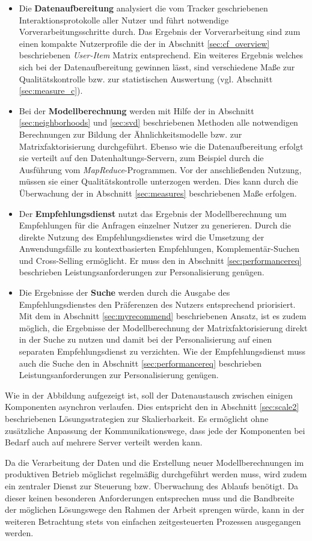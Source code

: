 \begin{itemize}
\item Die \textbf{Datenaufbereitung} analysiert die vom Tracker geschriebenen Interaktionsprotokolle aller Nutzer und führt notwendige Vorverarbeitungsschritte durch. Das Ergebnis der Vorverarbeitung sind zum einen kompakte Nutzerprofile die der in Abschnitt \ref{sec:cf_overview} beschriebenen \textit{User-Item} Matrix entsprechend. Ein weiteres Ergebnis welches sich bei der Datenaufbereitung gewinnen lässt, sind verschiedene Maße zur Qualitätskontrolle bzw. zur statistischen Auswertung (vgl. Abschnitt \ref{sec:measure_c}).
\item Bei der \textbf{Modellberechnung} werden mit Hilfe der in Abschnitt \ref{sec:neighborhoods} und \ref{sec:svd} beschriebenen Methoden alle notwendigen Berechnungen zur Bildung der Ähnlichkeitsmodelle bzw. zur Matrixfaktorisierung durchgeführt. Ebenso wie die Datenaufbereitung erfolgt sie verteilt auf den Datenhaltungs-Servern, zum Beispiel durch die Ausführung vom \textit{MapReduce}-Programmen. Vor der anschließenden Nutzung, müssen sie einer Qualitätskontrolle unterzogen werden. Dies kann durch die Überwachung der in Abschnitt \ref{sec:measures} beschriebenen Maße erfolgen.
\item Der \textbf{Empfehlungsdienst} nutzt das Ergebnis der Modellberechnung um Empfehlungen für die Anfragen einzelner Nutzer zu generieren. Durch die direkte Nutzung des Empfehlungsdienstes wird die Umsetzung der Anwendungsfälle zu kontextbasierten Empfehlungen, Komplementär-Suchen und Cross-Selling ermöglicht.  Er muss den in Abschnitt \ref{sec:performancereq} beschrieben Leistungsanforderungen zur Personalisierung genügen.
\item Die Ergebnisse der \textbf{Suche} werden durch die Ausgabe des Empfehlungsdienstes den Präferenzen des Nutzers entsprechend priorisiert. Mit dem in Abschnitt \ref{sec:myrecommend} beschriebenen Ansatz, ist es zudem möglich, die Ergebnisse der Modellberechnung der Matrixfaktorisierung direkt in der Suche zu nutzen und damit bei der Personalisierung auf einen separaten Empfehlungsdienst zu verzichten. Wie der Empfehlungsdienst muss auch die Suche den in Abschnitt \ref{sec:performancereq} beschrieben Leistungsanforderungen zur Personalisierung genügen.
\end{itemize}

Wie in der Abbildung aufgezeigt ist, soll der Datenaustausch zwischen einigen Komponenten asynchron verlaufen. Dies entspricht den in Abschnitt \ref{sec:scale2} beschriebenen Lösungsstrategien zur Skalierbarkeit. Es ermöglicht ohne zusätzliche Anpassung der Kommunikationswege, dass jede der Komponenten bei Bedarf auch auf mehrere Server verteilt werden kann.

Da die Verarbeitung der Daten und die Erstellung neuer Modellberechnungen im produktiven Betrieb möglichst regelmäßig durchgeführt werden muss, wird zudem ein zentraler Dienst zur Steuerung bzw. Überwachung des Ablaufs benötigt. Da dieser keinen besonderen Anforderungen entsprechen muss und die Bandbreite der möglichen Lösungswege den Rahmen der Arbeit sprengen würde, kann in der weiteren Betrachtung stets von einfachen zeitgesteuerten Prozessen ausgegangen werden. 